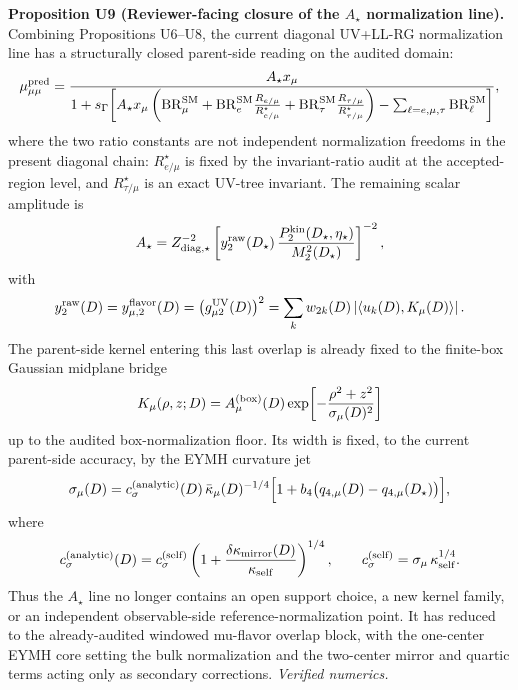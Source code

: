 \documentclass[aps,prd,onecolumn,notitlepage,nofootinbib,superscriptaddress,11pt,floatfix]{revtex4-2}
\begin{document}
\medskip\noindent\textbf{Proposition U9 (Reviewer-facing closure of the \texorpdfstring{$A_\star$}{A*} normalization line).}
Combining Propositions U6--U8, the current diagonal UV+LL-RG normalization line has a structurally closed parent-side reading on the audited domain:
\[
\mu_{\mu\mu}^{\rm pred}
=
\frac{A_\star x_\mu}
{1+s_\Gamma\!\left[
A_\star x_\mu
\left(
\mathrm{BR}_\mu^{\rm SM}
+\mathrm{BR}_e^{\rm SM}\frac{R_{e/\mu}}{R_{e/\mu}^\star}
+\mathrm{BR}_\tau^{\rm SM}\frac{R_{\tau/\mu}}{R_{\tau/\mu}^\star}
\right)
-\sum_{\ell=e,\mu,\tau}\mathrm{BR}_\ell^{\rm SM}
\right]},
\]
where the two ratio constants are not independent normalization freedoms in the present diagonal chain: \(R_{e/\mu}^\star\) is fixed by the invariant-ratio audit at the accepted-region level, and \(R_{\tau/\mu}^\star\) is an exact UV-tree invariant.  The remaining scalar amplitude is
\[
A_\star
=
Z_{{\rm diag},\star}^{-2}
\left[
y_2^{\rm raw}(D_\star)\,
\frac{P_2^{\rm kin}(D_\star,\eta_\star)}{M_2^2(D_\star)}
\right]^{-2},
\]
with
\[
y_2^{\rm raw}(D)
=
y_{\mu,2}^{\rm flavor}(D)
=
\bigl(g_{\mu2}^{\rm UV}(D)\bigr)^2
=
\sum_k w_{2k}(D)\left|\left\langle u_k(D),K_\mu(D)\right\rangle\right|.
\]
The parent-side kernel entering this last overlap is already fixed to the finite-box Gaussian midplane bridge
\[
K_\mu(\rho,z;D)
=
A_\mu^{\rm(box)}(D)
\exp\!\left[-\frac{\rho^2+z^2}{\sigma_\mu(D)^2}\right]
\]
up to the audited box-normalization floor.  Its width is fixed, to the current parent-side accuracy, by the EYMH curvature jet
\[
\sigma_\mu(D)
=
c_\sigma^{\rm(analytic)}(D)\,\bar\kappa_\mu(D)^{-1/4}
\Bigl[1+b_4\bigl(q_{4,\mu}(D)-q_{4,\mu}(D_\star)\bigr)\Bigr],
\]
where
\[
c_\sigma^{\rm(analytic)}(D)
=
c_\sigma^{\rm(self)}
\left(1+\frac{\delta\kappa_{\rm mirror}(D)}{\kappa_{\rm self}}\right)^{1/4},
\qquad
c_\sigma^{\rm(self)}=\sigma_\mu\,\kappa_{\rm self}^{1/4}.
\]
Thus the \(A_\star\) line no longer contains an open support choice, a new kernel family, or an independent observable-side reference-normalization point.  It has reduced to the already-audited windowed mu-flavor overlap block, with the one-center EYMH core setting the bulk normalization and the two-center mirror and quartic terms acting only as secondary corrections.
\emph{Verified numerics.}
\end{document}
